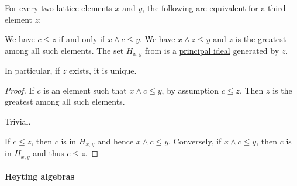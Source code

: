 \begin{proposition}\label{thm:relative_pseudocomplement_set}
  For every two \hyperref[def:lattice]{lattice} elements \( x \) and \( y \), the following are equivalent for a third element \( z \):
  \begin{thmenum}
     We have \( c \leq z \) if and only if \( x \wedge c \leq y \).
     We have \( x \wedge z \leq y \) and \( z \) is the greatest among all such elements.
     The set \( H_{x,y} \) from  is a \hyperref[def:lattice_ideal/principal]{principal ideal} generated by \( z \).
  \end{thmenum}
\end{proposition}
\begin{comments}
  \item In particular, if \( z \) exists, it is unique.
\end{comments}
\begin{proof}
   If \( c \) is an element such that \( x \wedge c \leq y \), by assumption \( c \leq z \). Then \( z \) is the greatest among all such elements.

   Trivial.

   If \( c \leq z \), then \( c \) is in \( H_{x,y} \) and hence \( x \wedge c \leq y \). Conversely, if \( x \wedge c \leq y \), then \( c \) is in \( H_{x,y} \) and thus \( c \leq z \).
\end{proof}

\paragraph{Heyting algebras}

